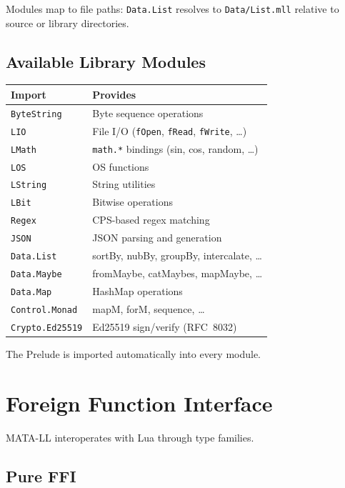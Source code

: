 \documentclass[11pt,a4paper]{article}
\begin{document}
Modules map to file paths: \texttt{Data.List} resolves to
\texttt{Data/List.mll} relative to source or library directories.

\subsection{Available Library Modules}

\begin{tabular}{@{}ll@{}}
\toprule
\textbf{Import} & \textbf{Provides} \\
\midrule
\texttt{ByteString}      & Byte sequence operations \\
\texttt{LIO}             & File I/O (\texttt{fOpen}, \texttt{fRead}, \texttt{fWrite}, \ldots) \\
\texttt{LMath}           & \texttt{math.*} bindings (sin, cos, random, \ldots) \\
\texttt{LOS}             & OS functions \\
\texttt{LString}         & String utilities \\
\texttt{LBit}            & Bitwise operations \\
\texttt{Regex}           & CPS-based regex matching \\
\texttt{JSON}            & JSON parsing and generation \\
\texttt{Data.List}       & sortBy, nubBy, groupBy, intercalate, \ldots \\
\texttt{Data.Maybe}      & fromMaybe, catMaybes, mapMaybe, \ldots \\
\texttt{Data.Map}        & HashMap operations \\
\texttt{Control.Monad}   & mapM, forM, sequence, \ldots \\
\texttt{Crypto.Ed25519}  & Ed25519 sign/verify (RFC~8032) \\
\bottomrule
\end{tabular}

The Prelude is imported automatically into every module.

\section{Foreign Function Interface}

MATA-LL interoperates with Lua through type families.

\subsection{Pure FFI}
\end{document}
